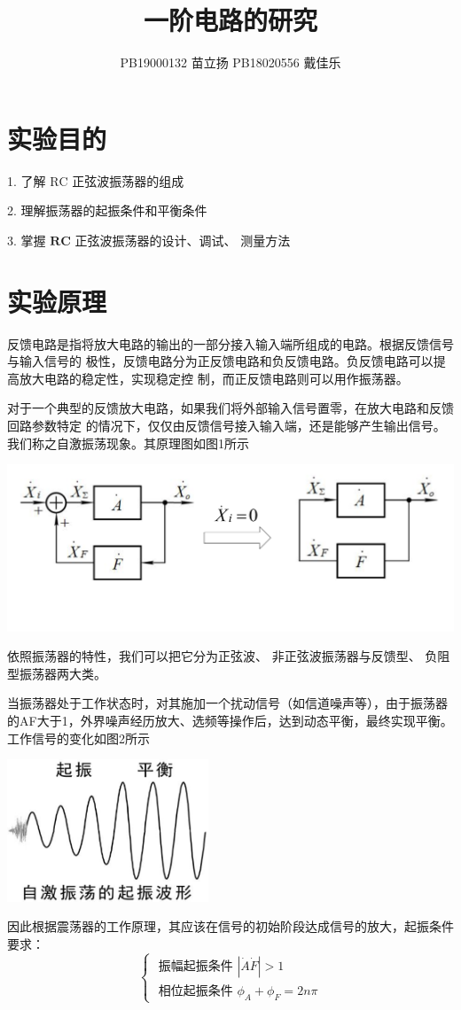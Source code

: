 \documentclass[a4paper,11pt,UTF8]{ctexart}
\title{一阶电路的研究}
\author{PB19000132 苗立扬  PB18020556 戴佳乐}
\begin{document}
\maketitle


\section{实验目的}
1. 了解 $\mathrm{RC}$ 正弦波振荡器的组成


2. 理解振荡器的起振条件和平衡条件


3. 掌握 $\mathbf{R C}$ 正弦波振荡器的设计、调试、 测量方法

\section{实验原理}
反馈电路是指将放大电路的输出的一部分接入输入端所组成的电路。根据反馈信号与输入信号的
极性，反馈电路分为正反馈电路和负反馈电路。负反馈电路可以提高放大电路的稳定性，实现稳定控
制，而正反馈电路则可以用作振荡器。


对于一个典型的反馈放大电路，如果我们将外部输入信号置零，在放大电路和反馈回路参数特定
的情况下，仅仅由反馈信号接入输入端，还是能够产生输出信号。我们称之自激振荡现象。其原理图如图1所示

	
	\includegraphics[width = \textwidth]{振荡原理1.png}

依照振荡器的特性，我们可以把它分为正弦波、 非正弦波振荡器与反馈型、 负阻型振荡器两大类。

当振荡器处于工作状态时，对其施加一个扰动信号（如信道噪声等），由于振荡器的AF大于1，外界噪声经历放大、选频等操作后，达到动态平衡，最终实现平衡。工作信号的变化如图2所示
\begin{center}
	
	\includegraphics[width = 0.45\textwidth]{波形.png}
\end{center}
因此根据震荡器的工作原理，其应该在信号的初始阶段达成信号的放大，起振条件要求：
$$
\left\{\begin{array}{l}
	\text { 振幅起振条件 }|\dot{A} \dot{F}|>1 \\
	\text { 相位起振条件 } \phi_{A}+\phi_{F}=2 n \pi
\end{array}\right.
$$
\end{document}
